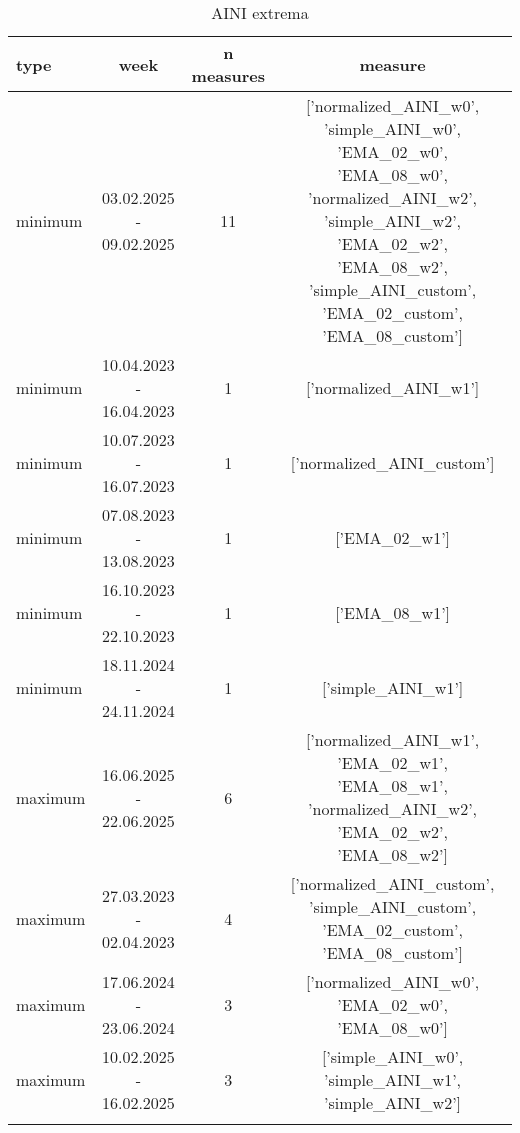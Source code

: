 \begin{table}[!htbp]
\centering
\begin{adjustbox}{width=\textwidth}
\begin{tabular}{lccc}
\toprule
\addlinespace
type & week & n measures & measure \\
\midrule
\addlinespace
minimum & 03.02.2025 - 09.02.2025 & 11 & ['normalized_AINI_w0', 'simple_AINI_w0', 'EMA_02_w0', 'EMA_08_w0', 'normalized_AINI_w2', 'simple_AINI_w2', 'EMA_02_w2', 'EMA_08_w2', 'simple_AINI_custom', 'EMA_02_custom', 'EMA_08_custom'] \\
minimum & 10.04.2023 - 16.04.2023 & 1 & ['normalized_AINI_w1'] \\
minimum & 10.07.2023 - 16.07.2023 & 1 & ['normalized_AINI_custom'] \\
minimum & 07.08.2023 - 13.08.2023 & 1 & ['EMA_02_w1'] \\
minimum & 16.10.2023 - 22.10.2023 & 1 & ['EMA_08_w1'] \\
minimum & 18.11.2024 - 24.11.2024 & 1 & ['simple_AINI_w1'] \\
maximum & 16.06.2025 - 22.06.2025 & 6 & ['normalized_AINI_w1', 'EMA_02_w1', 'EMA_08_w1', 'normalized_AINI_w2', 'EMA_02_w2', 'EMA_08_w2'] \\
maximum & 27.03.2023 - 02.04.2023 & 4 & ['normalized_AINI_custom', 'simple_AINI_custom', 'EMA_02_custom', 'EMA_08_custom'] \\
maximum & 17.06.2024 - 23.06.2024 & 3 & ['normalized_AINI_w0', 'EMA_02_w0', 'EMA_08_w0'] \\
maximum & 10.02.2025 - 16.02.2025 & 3 & ['simple_AINI_w0', 'simple_AINI_w1', 'simple_AINI_w2'] \\
\addlinespace
\bottomrule
\end{tabular}
\end{adjustbox}
\caption{AINI extrema}
\label{tab:aini_extrema}
\end{table}
